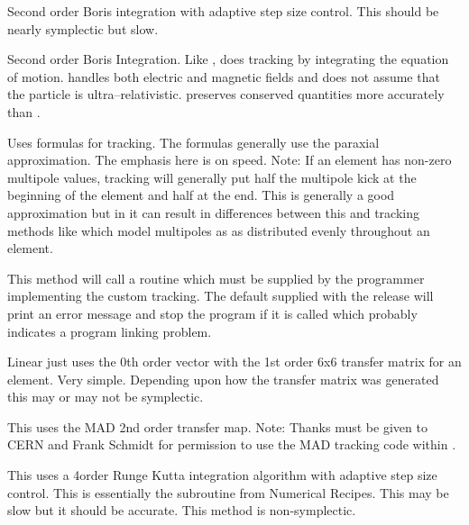 \begin{description}
\item[\vn{adaptive_boris}]
Second order Boris integration\cite{b:boris} with adaptive step size control.
This should be nearly symplectic but slow.

\item[\vn{Boris}]
Second order Boris Integration\cite{b:boris}. Like ,
 does tracking by integrating the equation of
motion.  handles both electric and magnetic fields and does
not assume that the particle is ultra--relativistic.  preserves
conserved quantities more accurately than .

\item[\vn{Bmad_Standard}]
Uses formulas for tracking. The formulas generally use the paraxial
approximation.  The emphasis here is on speed. Note: If an element has
non-zero multipole values,  tracking will generally
put half the multipole kick at the beginning of the element and half
at the end. This is generally a good approximation but in it can
result in differences between this and tracking methods like
 which model multipoles as as distributed evenly
throughout an element.

\item[\vn{Custom}]
This method will call a routine  which must be
supplied by the programmer implementing the custom tracking. The
default  supplied with the \bmad release will print
an error message and stop the program if it is called which probably
indicates a program linking problem.

\item[\vn{Linear}]
Linear just uses the 0th order vector with the 1st order 6x6 transfer
matrix for an element. Very simple.  Depending upon how the transfer
matrix was generated this may or may not be symplectic.

\item[\vn{MAD}]
This uses the MAD 2nd order transfer map. Note: Thanks must be given
to CERN and Frank Schmidt for permission to use the MAD tracking code
within \bmad.

\item[\vn{runge_kutta}]
This uses a 4\Th order Runge Kutta integration algorithm with adaptive
step size control.  This is essentially the  subroutine
from Numerical Recipes\cite{b:nr}. This may be slow but it should be
accurate. This method is non-symplectic.


\end{description}
